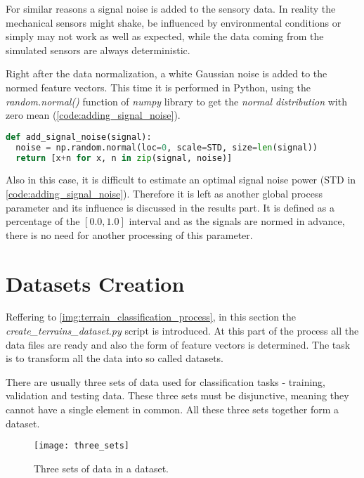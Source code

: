 For similar reasons a signal noise is added to the sensory data. In reality the mechanical sensors might shake, be influenced by environmental conditions or simply may not work as well as expected, while the data coming from the simulated sensors are always deterministic.

Right after the data normalization, a white Gaussian noise is added to the normed feature vectors. This time it is performed in Python, using the \textit{random.normal()} function of \textit{numpy} library to get the \textit{normal distribution} with zero mean (\cref{code:adding_signal_noise}).

\begin{lstlisting}[language=Python, caption={Adding signal noise in python}, label=code:adding_signal_noise]
def add_signal_noise(signal):
  noise = np.random.normal(loc=0, scale=STD, size=len(signal))
  return [x+n for x, n in zip(signal, noise)]
\end{lstlisting}

Also in this case, it is difficult to estimate an optimal signal noise power (STD in \cref{code:adding_signal_noise}). Therefore it is left as another global process parameter and its influence is discussed in the results part. It is defined as a percentage of the $ [0.0, 1.0] $ interval and as the signals are normed in advance, there is no need for another processing of this parameter.

\section{Datasets Creation} \label{sec:dataset_creation}
Reffering to \cref{img:terrain_classification_process}, in this section the \textit{create\_terrains\_dataset.py} script is introduced. At this part of the process all the data files are ready and also the form of feature vectors is determined. The task is to transform all the data into so called datasets.

There are usually three sets of data used for classification tasks - training, validation and testing data. These three sets must be disjunctive, meaning they cannot have a single element in common. All these three sets together form a dataset.

\begin{figure}[H]
  \centering
  \texttt{[image: three\_sets]}
  \caption{Three sets of data in a dataset.}
  \label{img:three_sets}
\end{figure}

